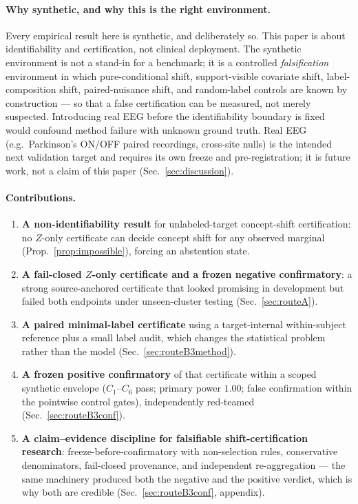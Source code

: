 \paragraph{Why synthetic, and why this is the right environment.}
Every empirical result here is synthetic, and deliberately so. This paper is about identifiability and
certification, not clinical deployment. The synthetic environment is not a stand-in for a benchmark; it is a
controlled \emph{falsification} environment in which pure-conditional shift, support-visible covariate
shift, label-composition shift, paired-nuisance shift, and random-label controls are known by construction
--- so that a false certification can be measured, not merely suspected. Introducing real EEG before the
identifiability boundary is fixed would confound method failure with unknown ground truth. Real EEG (e.g.\
Parkinson's ON/OFF paired recordings, cross-site nulls) is the intended next validation target and requires
its own freeze and pre-registration; it is future work, not a claim of this paper (Sec.~\ref{sec:discussion}).

\paragraph{Contributions.}
\begin{enumerate}
  \item \textbf{A non-identifiability result} for unlabeled-target concept-shift certification: no $Z$-only
        certificate can decide concept shift for any observed marginal (Prop.~\ref{prop:impossible}),
        forcing an abstention state. \claimtag{C-impossible}
  \item \textbf{A fail-closed $Z$-only certificate and a frozen negative confirmatory}: a strong
        source-anchored certificate that looked promising in development but failed both endpoints under
        unseen-cluster testing (Sec.~\ref{sec:routeA}). \claimtag{C-routeA-neg}
  \item \textbf{A paired minimal-label certificate} using a target-internal within-subject reference plus a
        small label audit, which changes the statistical problem rather than the model
        (Sec.~\ref{sec:routeB3method}). \claimtag{C-routeB3-pos}
  \item \textbf{A frozen positive confirmatory} of that certificate within a scoped synthetic envelope
        ($C_1$--$C_6$ pass; primary power $1.00$; false confirmation within the pointwise control gates),
        independently red-teamed (Sec.~\ref{sec:routeB3conf}). \claimtag{C-routeB3-pos}
  \item \textbf{A claim--evidence discipline for falsifiable shift-certification research}:
        freeze-before-confirmatory with non-selection rules, conservative denominators, fail-closed
        provenance, and independent re-aggregation --- the same machinery produced both the negative and the
        positive verdict, which is why both are credible (Sec.~\ref{sec:routeB3conf}, appendix). 
\end{enumerate}


